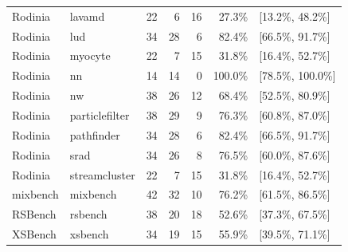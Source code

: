 \begin{table}[t]
\begin{tabular}{@{}llrrrrl@{}}
Rodinia & lavamd & 22 & 6 & 16 & 27.3\% & [13.2\%, 48.2\%] \\
Rodinia & lud & 34 & 28 & 6 & 82.4\% & [66.5\%, 91.7\%] \\
Rodinia & myocyte & 22 & 7 & 15 & 31.8\% & [16.4\%, 52.7\%] \\
Rodinia & nn & 14 & 14 & 0 & 100.0\% & [78.5\%, 100.0\%] \\
Rodinia & nw & 38 & 26 & 12 & 68.4\% & [52.5\%, 80.9\%] \\
Rodinia & particlefilter & 38 & 29 & 9 & 76.3\% & [60.8\%, 87.0\%] \\
Rodinia & pathfinder & 34 & 28 & 6 & 82.4\% & [66.5\%, 91.7\%] \\
Rodinia & srad & 34 & 26 & 8 & 76.5\% & [60.0\%, 87.6\%] \\
Rodinia & streamcluster & 22 & 7 & 15 & 31.8\% & [16.4\%, 52.7\%] \\
\midrule
mixbench & mixbench & 42 & 32 & 10 & 76.2\% & [61.5\%, 86.5\%] \\
RSBench & rsbench & 38 & 20 & 18 & 52.6\% & [37.3\%, 67.5\%] \\
XSBench & xsbench & 34 & 19 & 15 & 55.9\% & [39.5\%, 71.1\%] \\
\bottomrule
\end{tabular}
\end{table}

\newpage

